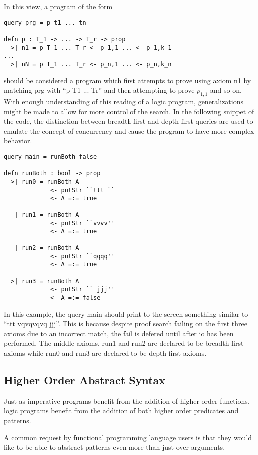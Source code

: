 In this view, a program of the form

\begin{lstlisting}
query prg = p t1 ... tn

defn p : T_1 -> ... -> T_r -> prop
  >| n1 = p T_1 ... T_r <- p_1,1 ... <- p_1,k_1
...
  >| nN = p T_1 ... T_r <- p_n,1 ... <- p_n,k_n
\end{lstlisting}

should be considered a program which first attempts to prove using axiom n1 by matching prg with ``p T1 ... Tr'' and then
attempting to prove $p_{1,1}$ and so on.    With enough understanding of this reading of a logic program, generalizations might be made
to allow for more control of the search.  In the following snippet of the code, the distinction between breadth first and depth first
queries are used to emulate the concept of concurrency and cause the program to have more complex behavior.

\begin{lstlisting}
query main = runBoth false

defn runBoth : bool -> prop
  >| run0 = runBoth A 
             <- putStr ``ttt ``
             <- A =:= true

   | run1 = runBoth A
             <- putStr ``vvvv''
             <- A =:= true

   | run2 = runBoth A
             <- putStr ``qqqq''
             <- A =:= true

  >| run3 = runBoth A
             <- putStr `` jjj''
             <- A =:= false
\end{lstlisting}

In this example, the query main should print to the screen something similar to ``ttt vqvqvqvq jjj''.  This is because
despite proof search failing on the first three axioms due to an incorrect match, 
the fail is defered until after io has been performed.  The middle axioms, run1 and run2 are declared to be
breadth first axioms while run0 and run3 are declared to be depth first axioms.  


\subsection{Higher Order Abstract Syntax}

Just as imperative programs benefit from the addition of higher order functions, logic programs benefit from the addition of both
higher order predicates and patterns.  

A common request by functional programming language users is that they would like to be able to abstract patterns even more than just over
arguments.  

